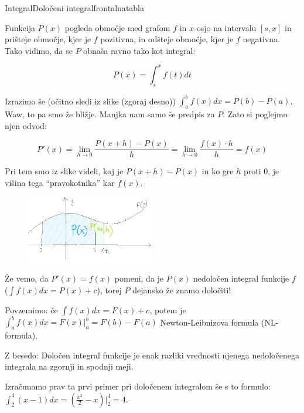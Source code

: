 \begin{priprava}{}{}{Integral}{Določeni integral}{frontalna}{tabla}
\newpage

Funkcija $ P(x) $ pogleda območje med grafom $ f $ in $ x $-osjo na intervalu $ [ s, x] $  in prišteje območje, kjer je $ f $ pozitivna, in odšteje območje, kjer je $ f $ negativna. Tako vidimo, da se $ P $ obnaša ravno tako kot integral:

$$ P(x) = \int_s^x f(t) dt $$

Izrazimo še (očitno sledi iz slike (zgoraj desno)) $ \int_a^b f(x) dx = P(b) - P(a) $. Waw, to pa smo že bližje. Manjka nam samo še predpis za $ P $. Zato si  poglejmo njen odvod:

$$
P'(x) = \lim_{h \rightarrow 0} \frac{P(x + h) - P(x)}{h} = \lim_{h \rightarrow 0} \frac{f(x) \cdot h}{h} = f(x)
$$

Pri tem smo iz slike videli, kaj je $ P(x + h) - P(x) $ in ko gre $ h $ proti 0, je višina tega ``pravokotnika'' kar $ f(x) $.

\begin{figure}[h]
    \centering
    \includegraphics[width=0.5\textwidth]{slike/NL_P(x)_P(x+h).png}
\end{figure}


Že vemo, da $ P'(x) = f(x) $ pomeni, da je $ P(x) $ nedoločen integral funkcije $ f $ ($ \int f(x) dx = P(x) + c $), torej $ P $ dejansko že znamo določiti!

Povzemimo: če \textcolor{zelena}{$ \int f(x) dx = F(x) + c $}, potem je \textcolor{rdeca}{$\int_a^b f(x) dx = F(x)|_a^b = F(b) - F(a) $}  Newton-Leibnizova formula (NL-formula).

Z besedo: Določen integral funkcije je enak razliki vrednosti njenega nedoločenega integrala na zgornji in spodnji meji.

Izračunamo prav ta prvi primer pri določenem integralom še s to formulo: $ \int_2^4 (x - 1) dx = (\frac{x^2}{2} - x) |_2^4 = 4 $.



\end{priprava}
